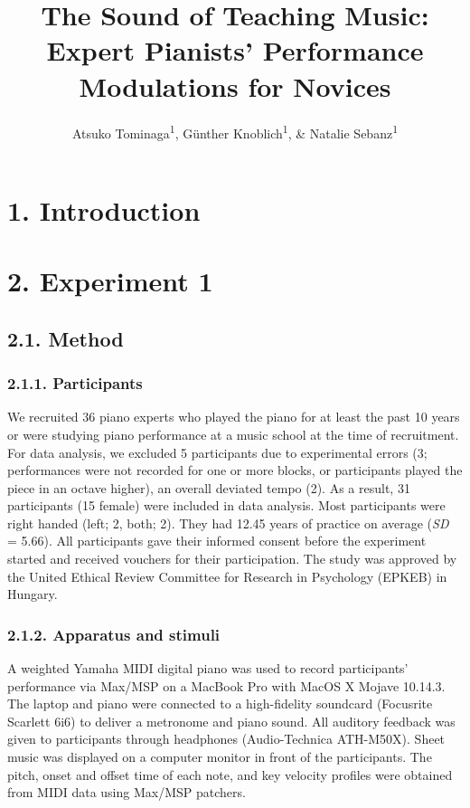 \documentclass[
  english,
  man,floatsintext]{apa6}
\author{Atsuko Tominaga\textsuperscript{1}, Günther Knoblich\textsuperscript{1}, \& Natalie Sebanz\textsuperscript{1}}
\affiliation{
\vspace{0.5cm}
\textsuperscript{1} Department of Cognitive Science, Central European University}
\title{The Sound of Teaching Music: Expert Pianists' Performance Modulations for Novices}
\date{}
\begin{document}
\maketitle

\hypertarget{introduction}{%
\section{1. Introduction}\label{introduction}}

\hypertarget{experiment-1}{%
\section{2. Experiment 1}\label{experiment-1}}

\hypertarget{method}{%
\subsection{2.1. Method}\label{method}}

\hypertarget{participants}{%
\subsubsection{2.1.1. Participants}\label{participants}}

We recruited 36 piano experts who played the piano for at least the past 10 years or were studying piano performance at a music school at the time of recruitment. For data analysis, we excluded 5 participants due to experimental errors (3; performances were not recorded for one or more blocks, or participants played the piece in an octave higher), an overall deviated tempo (2). As a result, 31 participants (15 female) were included in data analysis. Most participants were right handed (left; 2, both; 2). They had 12.45 years of practice on average (\emph{SD} = 5.66). All participants gave their informed consent before the experiment started and received vouchers for their participation. The study was approved by the United Ethical Review Committee for Research in Psychology (EPKEB) in Hungary.

\hypertarget{apparatus-and-stimuli}{%
\subsubsection{2.1.2. Apparatus and stimuli}\label{apparatus-and-stimuli}}

A weighted Yamaha MIDI digital piano was used to record participants' performance via Max/MSP on a MacBook Pro with MacOS X Mojave 10.14.3. The laptop and piano were connected to a high-fidelity soundcard (Focusrite Scarlett 6i6) to deliver a metronome and piano sound. All auditory feedback was given to participants through headphones (Audio-Technica ATH-M50X). Sheet music was displayed on a computer monitor in front of the participants. The pitch, onset and offset time of each note, and key velocity profiles were obtained from MIDI data using Max/MSP patchers.
\end{document}
